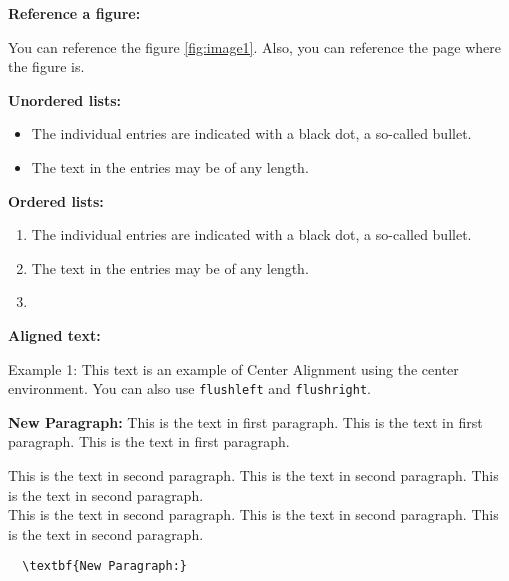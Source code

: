 




  \maketitle

  

  \tableofcontents
  \thispagestyle{empty}
  \clearpage

  \listoffigures
  \thispagestyle{empty}
  \clearpage


  
  

\textbf{Reference a figure:}

You can reference the figure \ref{fig:image1}. Also, you can reference the page \pageref{fig:image1} where the figure is.

\textbf{Unordered lists:}

\begin{itemize}
  \item The individual entries are indicated with a black dot, a so-called bullet.
  \item The text in the entries may be of any length.
\end{itemize}

\textbf{Ordered lists:}

\begin{enumerate}
  \item The individual entries are indicated with a black dot, a so-called bullet.
  \item The text in the entries may be of any length.
  \item \blindtext
\end{enumerate}

\textbf{Aligned text:}
\begin{center}
  Example 1: This text is an example of Center Alignment using the center environment. You can also use \verb|flushleft| and \verb|flushright|.
\end{center}

\textbf{New Paragraph:}
This is the text in first paragraph. This is the text in first paragraph. This is the text in first paragraph. \par
This is the text in second paragraph. This is the text in second paragraph. This is the text in second paragraph.
\\ %
This is the text in second paragraph. This is the text in second paragraph. This is the text in second paragraph.

\begin{verbatim}
  \textbf{New Paragraph:}
\end{verbatim}

